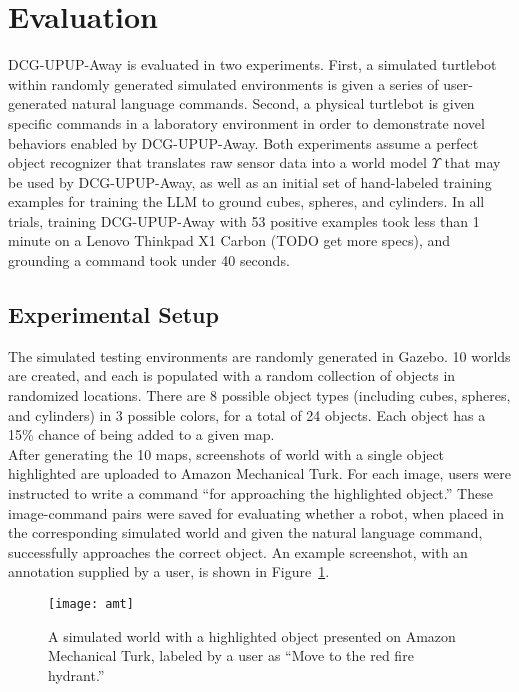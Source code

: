 \section{Evaluation}
\label{sec:evaluation}
DCG-UPUP-Away is evaluated in two experiments.
First, a simulated turtlebot within randomly generated simulated environments is given a series of user-generated natural language commands.
Second, a physical turtlebot is given specific commands in a laboratory environment in order to demonstrate novel behaviors enabled by DCG-UPUP-Away.
Both experiments assume a perfect object recognizer that translates raw sensor data into a world model $\Upsilon$ that may be used by DCG-UPUP-Away, as well as an initial set of hand-labeled training examples for training the LLM to ground cubes, spheres, and cylinders.
In all trials, training DCG-UPUP-Away with 53 positive examples took less than 1 minute on a Lenovo Thinkpad X1 Carbon (TODO get more specs), and grounding a command took under 40 seconds.\\
\subsection{Experimental Setup}
\indent The simulated testing environments are randomly generated in Gazebo.
10 worlds are created, and each is populated with a random collection of objects in randomized locations.
There are 8 possible object types (including cubes, spheres, and cylinders) in 3 possible colors, for a total of 24 objects.
Each object has a 15\% chance of being added to a given map.\\
\indent After generating the 10 maps, screenshots of world with a single object highlighted are uploaded to Amazon Mechanical Turk.
For each image, users were instructed to write a command ``for approaching the highlighted object.''
These image-command pairs were saved for evaluating whether a robot, when placed in the corresponding simulated world and given the natural language command, successfully approaches the correct object.
An example screenshot, with an annotation supplied by a user, is shown in Figure~\ref{fig:amt}.\\
\begin{figure}[h]
	\centering
    \texttt{[image: amt]}
	\caption{A simulated world with a highlighted object presented on Amazon Mechanical Turk, labeled by a user as ``Move to the red fire hydrant.''}
	\label{fig:amt}
\end{figure}

